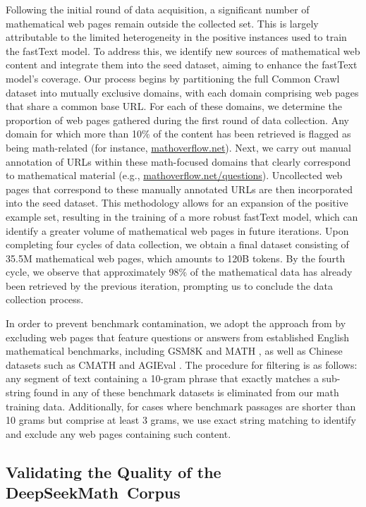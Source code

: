 \begin{itemize}[topsep=0pt]
Following the initial round of data acquisition, a significant number of mathematical web pages remain outside the collected set. This is largely attributable to the limited heterogeneity in the positive instances used to train the fastText model. To address this, we identify new sources of mathematical web content and integrate them into the seed dataset, aiming to enhance the fastText model’s coverage. Our process begins by partitioning the full Common Crawl dataset into mutually exclusive domains, with each domain comprising web pages that share a common base URL. For each of these domains, we determine the proportion of web pages gathered during the first round of data collection. Any domain for which more than 10\% of the content has been retrieved is flagged as being math-related (for instance, \url{mathoverflow.net}).
Next, we carry out manual annotation of URLs within these math-focused domains that clearly correspond to mathematical material (e.g., \url{mathoverflow.net/questions}).
Uncollected web pages that correspond to these manually annotated URLs are then incorporated into the seed dataset. This methodology allows for an expansion of the positive example set, resulting in the training of a more robust fastText model, which can identify a greater volume of mathematical web pages in future iterations. Upon completing four cycles of data collection, we obtain a final dataset consisting of 35.5M mathematical web pages, which amounts to 120B tokens. By the fourth cycle, we observe that approximately 98\% of the mathematical data has already been retrieved by the previous iteration, prompting us to conclude the data collection process.

In order to prevent benchmark contamination, we adopt the approach from \cite{deepseek-coder} by excluding web pages that feature questions or answers from established English mathematical benchmarks, including GSM8K \citep{gsm8k} and MATH \citep{MATH}, as well as Chinese datasets such as CMATH \citep{wei2023cmath} and AGIEval \citep{agieval}. The procedure for filtering is as follows: any segment of text containing a 10-gram phrase that exactly matches a sub-string found in any of these benchmark datasets is eliminated from our math training data. Additionally, for cases where benchmark passages are shorter than 10 grams but comprise at least 3 grams, we use exact string matching to identify and exclude any web pages containing such content.

\subsection{Validating the Quality of the DeepSeekMath~Corpus}


\end{itemize}
